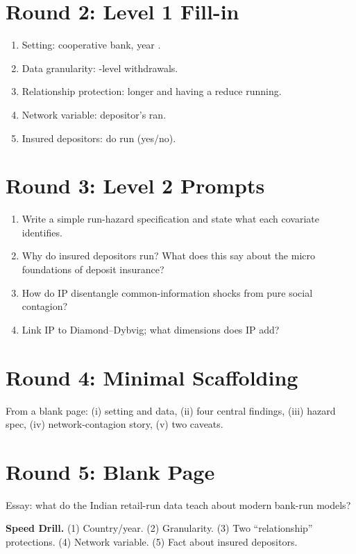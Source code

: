 \documentclass[11pt]{article}
\newcommand{\blank}[1]{\underline{\hspace{#1}}}
\begin{document}
\section*{Round 2: Level 1 Fill-in}
\begin{enumerate}
\item Setting: \blank{1cm} cooperative bank, year \blank{1cm}.
\item Data granularity: \blank{1cm}-level withdrawals.
\item Relationship protection: longer \blank{1.5cm} and having a \blank{1cm} reduce running.
\item Network variable: depositor's \blank{2cm} ran.
\item Insured depositors: do \blank{1cm} run (yes/no).
\end{enumerate}

\section*{Round 3: Level 2 Prompts}
\begin{enumerate}
\item Write a simple run-hazard specification and state what each covariate identifies.
\item Why do insured depositors run? What does this say about the micro foundations of deposit insurance?
\item How do IP disentangle common-information shocks from pure social contagion?
\item Link IP to Diamond--Dybvig; what dimensions does IP add?
\end{enumerate}

\section*{Round 4: Minimal Scaffolding}
From a blank page: (i) setting and data, (ii) four central findings, (iii) hazard spec, (iv) network-contagion story, (v) two caveats.

\section*{Round 5: Blank Page}
Essay: what do the Indian retail-run data teach about modern bank-run models?

\vspace{6pt}
\begin{drillbox}
\textbf{Speed Drill.} (1) Country/year. (2) Granularity. (3) Two ``relationship'' protections. (4) Network variable. (5) Fact about insured depositors.
\end{drillbox}
\end{document}
